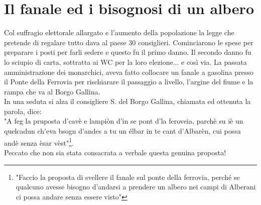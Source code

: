 
\chapter{Il fanale ed i bisognosi di un albero}
Col suffragio elettorale allargato e l'aumento della popolazione la legge che pretende di regalare tutto dava al paese 30 consiglieri. Cominciarono le spese per preparare i posti per farli sedere e questo fu il primo danno. Il secondo danno fu lo sciupio di carta, sottratta ai WC per la loro elezione... e così via. La passata amministrazione dei monarchici, aveva fatto collocare un fanale a gasolina presso il Ponte della Ferrovia per rischiarare il passaggio a livello, l'argine del fiume e la rampa che va al Borgo Gallina.\\
In una seduta si alza il consigliere S.\: \: del Borgo Gallina, chiamata ed ottenuta la parola, dice:\\
"A feg la pruposta d'cavè e lampiòn d'in se pont d'la feroveia, parchè su iè un quelcadun ch'eva bsogn d'andes a tu un élbar in te cant d'Albarèn, cui possa andè senza èsar vèst"\footnote{"Faccio la proposta di svellere il fanale sul ponte della ferrovia, perché se qualcuno avesse bisogno d'andarsi a prendere un albero nei campi di Alberani ci possa andare senza essere visto"}.\\
Peccato che non sia stata consacrata a verbale questa genuina proposta!

